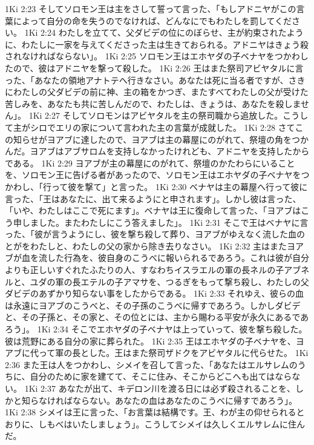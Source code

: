 1Ki 2:23  そしてソロモン王は主をさして誓って言った、「もしアドニヤがこの言葉によって自分の命を失うのでなければ、どんなにでもわたしを罰してください。
1Ki 2:24  わたしを立てて、父ダビデの位にのぼらせ、主が約束されたように、わたしに一家を与えてくださった主は生きておられる。アドニヤはきょう殺されなければならない」。
1Ki 2:25  ソロモン王はエホヤダの子ベナヤをつかわしたので、彼はアドニヤを撃って殺した。
1Ki 2:26  王はまた祭司アビヤタルに言った、「あなたの領地アナトテへ行きなさい。あなたは死に当る者ですが、さきにわたしの父ダビデの前に神、主の箱をかつぎ、またすべてわたしの父が受けた苦しみを、あなたも共に苦しんだので、わたしは、きょうは、あなたを殺しません」。
1Ki 2:27  そしてソロモンはアビヤタルを主の祭司職から追放した。こうして主がシロでエリの家について言われた主の言葉が成就した。
1Ki 2:28  さてこの知らせがヨアブに達したので、ヨアブは主の幕屋にのがれて、祭壇の角をつかんだ。ヨアブはアブサロムを支持しなかったけれども、アドニヤを支持したからである。
1Ki 2:29  ヨアブが主の幕屋にのがれて、祭壇のかたわらにいることを、ソロモン王に告げる者があったので、ソロモン王はエホヤダの子ベナヤをつかわし、「行って彼を撃て」と言った。
1Ki 2:30  ベナヤは主の幕屋へ行って彼に言った、「王はあなたに、出て来るようにと申されます」。しかし彼は言った、「いや、わたしはここで死にます」。ベナヤは王に復命して言った、「ヨアブはこう申しました。またわたしにこう答えました」。
1Ki 2:31  そこで王はベナヤに言った、「彼が言うようにし、彼を撃ち殺して葬り、ヨアブがゆえなく流した血のとがをわたしと、わたしの父の家から除き去りなさい。
1Ki 2:32  主はまたヨアブが血を流した行為を、彼自身のこうべに報いられるであろう。これは彼が自分よりも正しいすぐれたふたりの人、すなわちイスラエルの軍の長ネルの子アブネルと、ユダの軍の長エテルの子アマサを、つるぎをもって撃ち殺し、わたしの父ダビデのあずかり知らない事をしたからである。
1Ki 2:33  それゆえ、彼らの血は永遠にヨアブのこうべと、その子孫のこうべに帰すであろう。しかしダビデと、その子孫と、その家と、その位とには、主から賜わる平安が永久にあるであろう」。
1Ki 2:34  そこでエホヤダの子ベナヤは上っていって、彼を撃ち殺した。彼は荒野にある自分の家に葬られた。
1Ki 2:35  王はエホヤダの子ベナヤを、ヨアブに代って軍の長とした。王はまた祭司ザドクをアビヤタルに代らせた。
1Ki 2:36  また王は人をつかわし、シメイを召して言った、「あなたはエルサレムのうちに、自分のために家を建てて、そこに住み、そこからどこへも出てはならない。
1Ki 2:37  あなたが出て、キデロン川を渡る日には必ず殺されることを、しかと知らなければならない。あなたの血はあなたのこうべに帰すであろう」。
1Ki 2:38  シメイは王に言った、「お言葉は結構です。王、わが主の仰せられるとおりに、しもべはいたしましょう」。こうしてシメイは久しくエルサレムに住んだ。
